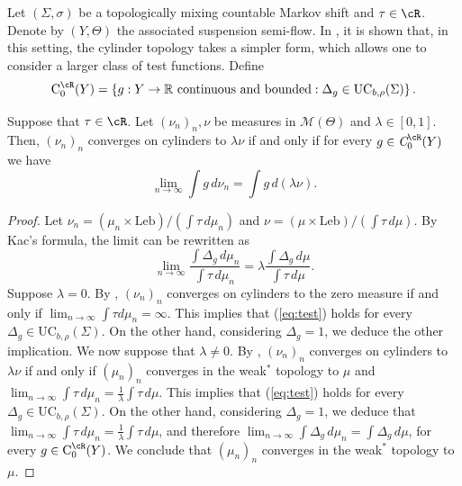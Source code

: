 \documentclass[letterpaper,11pt]{amsart}
\numberwithin{equation}{section}     %
\newcommand{\M}{\mathcal{M}}
\newcommand{\R}{\mathbb{R}}
\def\R{{\mathbb R}}
\def\M{{\mathcal M}}
\def\M{\mathcal{M}}
\begin{document}
 

Let $(\Sigma,\sigma)$ be a topologically mixing countable Markov shift and $\tau\in \cR$. Denote by $(Y,\Theta)$ the associated suspension semi-flow. In \cite[Lemma 6.9 and Lemma 6.10]{iv}, it is shown that, in this setting,  the cylinder topology takes a simpler form, which allows one to consider a larger class of test functions. Define
\begin{equation*}
\text{C}^{\cR}_0(Y)= \left\{ g:Y \to\R \text{ continuous and bounded}: \Delta_g\in \text{UC}_{b,\rho}(\Sigma)	\right\}.
\end{equation*}

\begin{lemma}\label{prop:test3}
Suppose that $\tau\in \cR$. Let $(\nu_n)_n, \nu$ be measures in $\M(\Theta)$ and $\lambda \in [0,1]$.  Then, $(\nu_n)_n$ converges on cylinders to $\lambda \nu$ if and only if for every $g\in \emph{C}^{\cR}_0(Y)$ we have
\begin{equation*}
\lim_{n \to \infty} \int g\, d \nu_n= \int g \, d (\lambda\nu).
\end{equation*} 
 \end{lemma}
 
\begin{proof} Let $\nu_n= (\mu_n \times \text{Leb})/(\int \tau \, d \mu_n)$ and $\nu= (\mu \times \text{Leb})/(\int \tau \, d \mu)$.  By Kac's formula, the limit can be rewritten as \begin{equation}\label{eq:test2}
\lim_{n \to \infty}  \frac{\int \Delta_g \, d \mu_n }{\int \tau\, d \mu_n}= \lambda  \frac{\int \Delta_g \, d \mu}{\int \tau\, d \mu}.
 \end{equation}
Suppose $\lambda=0$. By \cite[Lemma 6.9]{iv}, $(\nu_n)_n$ converges on cylinders to the zero measure if and only if $\lim_{n\to\infty}\int \tau d\mu_n=\infty$. This implies that (\ref{eq:test}) holds for every $\Delta_g\in  \text{UC}_{b,\rho}(\Sigma)$. On the other hand, considering $\Delta_g=1$, we deduce the other implication. We now suppose that $\lambda\ne 0$. By \cite[Lemma 6.10]{iv}, $(\nu_n)_n$ converges on cylinders to $\lambda\nu$ if and only if $(\mu_n)_n$ converges in the weak$^\ast$ topology to $\mu$ and $\lim_{n\to\infty}\int \tau \, d\mu_n=\frac{1}{\lambda}\int \tau \, d\mu$. This implies that (\ref{eq:test}) holds for every $\Delta_g\in  \text{UC}_{b,\rho}(\Sigma)$. On the other hand, considering  $\Delta_g=1$, we deduce that $\lim_{n\to\infty}\int \tau \, d\mu_n=\frac{1}{\lambda}\int \tau \, d\mu$, and therefore $\lim_{n\to\infty}\int \Delta_g \, d\mu_n=\int \Delta_g \, d\mu$, for every $g\in\text{C}^{\cR}_0(Y)$. We conclude that $(\mu_n)_n$ converges in the weak$^\ast$ topology to $\mu$. \end{proof}
\end{document}
